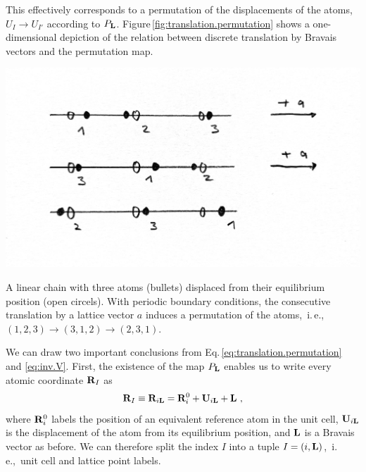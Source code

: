 This effectively corresponds to a permutation of the displacements of the atoms, $U_I \to U_{I'}$ according to $P_{\bf L}$. Figure\,\ref{fig:translation.permutation} shows a one-dimensional depiction of the relation between discrete translation by Bravais vectors and the permutation map.
\begin{marginfigure}
	\centering
	\includegraphics[width=\textwidth]{./sketches/permutation1.jpg}
	\caption{A linear chain with three atoms (bullets) displaced from their equilibrium position (open circels). With periodic boundary conditions, the consecutive translation by a lattice vector $a$ induces a permutation of the atoms,~i.\,e.,~$(1, 2 , 3) \to (3, 1, 2) \to (2, 3, 1)$.}
	\label{fig:translation.permutation}
\end{marginfigure}

We can draw two important conclusions from Eq.\,\eqref{eq:translation.permutation} and \eqref{eq:inv.V}. First, the existence of the map $P_{\bf L}$ enables us to write every atomic coordinate ${\bf R}_I$ as
\begin{align}
	{\bf R}_I \equiv {\bf R}_{i {\bf L}} 
		= {\bf R}^0_i + {\bf U}_{i {\bf L}} + {\bf L}~,
	\label{eq:R_iL}
\end{align}
where ${\bf R}^0_i$ labels the position of an equivalent reference atom in the unit cell, ${\bf U}_{i {\bf L}}$ is the displacement of the atom from its equilibrium position, and $\bf L$ is a Bravais vector as before.
We can therefore split the index $I$ into a tuple $I = (i, {\bf L})$,~i.\,e.,~unit cell and lattice point labels.

